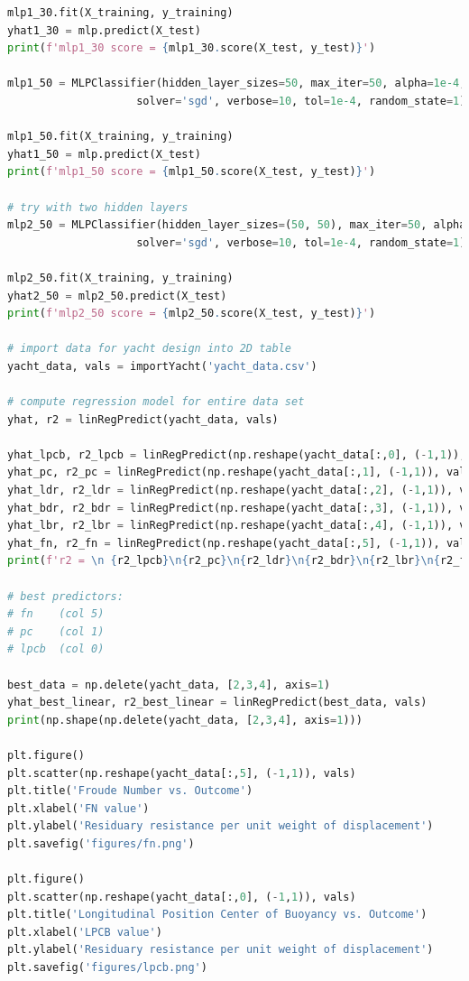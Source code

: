 \documentclass[11pt,a4paper]{article}
\begin{document}
\begin{lstlisting}[language=Python]
mlp1_30.fit(X_training, y_training)
yhat1_30 = mlp.predict(X_test)
print(f'mlp1_30 score = {mlp1_30.score(X_test, y_test)}')

mlp1_50 = MLPClassifier(hidden_layer_sizes=50, max_iter=50, alpha=1e-4,
                    solver='sgd', verbose=10, tol=1e-4, random_state=1)

mlp1_50.fit(X_training, y_training)
yhat1_50 = mlp.predict(X_test)
print(f'mlp1_50 score = {mlp1_50.score(X_test, y_test)}')

# try with two hidden layers
mlp2_50 = MLPClassifier(hidden_layer_sizes=(50, 50), max_iter=50, alpha=1e-4,
                    solver='sgd', verbose=10, tol=1e-4, random_state=1)

mlp2_50.fit(X_training, y_training)
yhat2_50 = mlp2_50.predict(X_test)
print(f'mlp2_50 score = {mlp2_50.score(X_test, y_test)}')

# import data for yacht design into 2D table
yacht_data, vals = importYacht('yacht_data.csv')

# compute regression model for entire data set
yhat, r2 = linRegPredict(yacht_data, vals)

yhat_lpcb, r2_lpcb = linRegPredict(np.reshape(yacht_data[:,0], (-1,1)), vals)
yhat_pc, r2_pc = linRegPredict(np.reshape(yacht_data[:,1], (-1,1)), vals)
yhat_ldr, r2_ldr = linRegPredict(np.reshape(yacht_data[:,2], (-1,1)), vals)
yhat_bdr, r2_bdr = linRegPredict(np.reshape(yacht_data[:,3], (-1,1)), vals)
yhat_lbr, r2_lbr = linRegPredict(np.reshape(yacht_data[:,4], (-1,1)), vals)
yhat_fn, r2_fn = linRegPredict(np.reshape(yacht_data[:,5], (-1,1)), vals)
print(f'r2 = \n {r2_lpcb}\n{r2_pc}\n{r2_ldr}\n{r2_bdr}\n{r2_lbr}\n{r2_fn}\n')

# best predictors:
# fn    (col 5)
# pc    (col 1)
# lpcb  (col 0)

best_data = np.delete(yacht_data, [2,3,4], axis=1)
yhat_best_linear, r2_best_linear = linRegPredict(best_data, vals)
print(np.shape(np.delete(yacht_data, [2,3,4], axis=1)))

plt.figure()
plt.scatter(np.reshape(yacht_data[:,5], (-1,1)), vals)
plt.title('Froude Number vs. Outcome')
plt.xlabel('FN value')
plt.ylabel('Residuary resistance per unit weight of displacement')
plt.savefig('figures/fn.png')

plt.figure()
plt.scatter(np.reshape(yacht_data[:,0], (-1,1)), vals)
plt.title('Longitudinal Position Center of Buoyancy vs. Outcome')
plt.xlabel('LPCB value')
plt.ylabel('Residuary resistance per unit weight of displacement')
plt.savefig('figures/lpcb.png')


\end{lstlisting}
\end{document}
